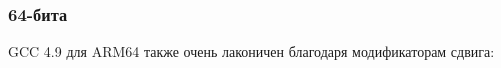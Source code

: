 \ifdefined\IncludeMIPS
{}


\fi

\subsubsection{64-бита}






\ifdefined\IncludeARM
{}

\ifdefined\IncludeGCC
GCC 4.9 для ARM64 также очень лаконичен благодаря модификаторам сдвига:



\fi
\fi
